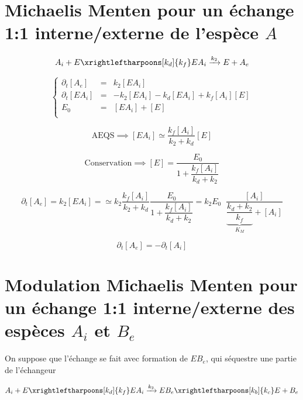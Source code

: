 \documentclass[aps,12pt]{revtex4}
\begin{document}
\section{Michaelis Menten pour un échange 1:1 interne/externe de l'espèce $A$}

\begin{equation}
	A_i + E \xrightleftharpoons[k_d]{k_f} EA_i \xrightarrow[]{k_2} E + A_e
\end{equation}

\begin{equation}
\left\lbrace
\begin{array}{rcl}
\partial_t [A_e]  & = & k_2 [EA_i] \\
\partial_t [EA_i] & = & -k_2 [EA_i] - k_d [EA_i] + k_f[A_i][E]\\
E_0 & = & [EA_i] + [E]\\
\end{array}
\right.
\end{equation}

\begin{equation}
	\mathrm{AEQS} \implies [EA_i] \simeq \dfrac{k_f[A_i]}{k_2 + k_d} [E]
\end{equation}

\begin{equation}
	\mathrm{Conservation} \implies [E] = \dfrac{E_0}{1+\dfrac{k_f[A_i]}{k_d+k_2}}
\end{equation}

\begin{equation}
	\partial_t [A_e] = k_2 [EA_i] 
	= \simeq k_2 \dfrac{k_f[A_i]}{k_2 + k_d} \dfrac{E_0}{1+\dfrac{k_f[A_i]}{k_d+k_2}}
	 = k_2 E_0 \;\; \dfrac{[A_i]}{ \underbrace{\dfrac{k_d+k_2}{k_f}}_{K_M} + [A_i]}
\end{equation}

\begin{equation}
\partial_t [A_e] = - \partial_t [A_i]
\end{equation}


\section{Modulation Michaelis Menten pour un échange 1:1 interne/externe des espèces $A_i$ et $B_e$}

On suppose que l'échange se fait avec formation de $EB_e$, qui séquestre une partie de l'échangeur

\begin{equation}
	A_i + E   \xrightleftharpoons[k_d]{k_f} EA_i   \xrightarrow[]{k_2} EB_e   \xrightleftharpoons[k_b]{k_c} E + B_e  
\end{equation}
\end{document}
